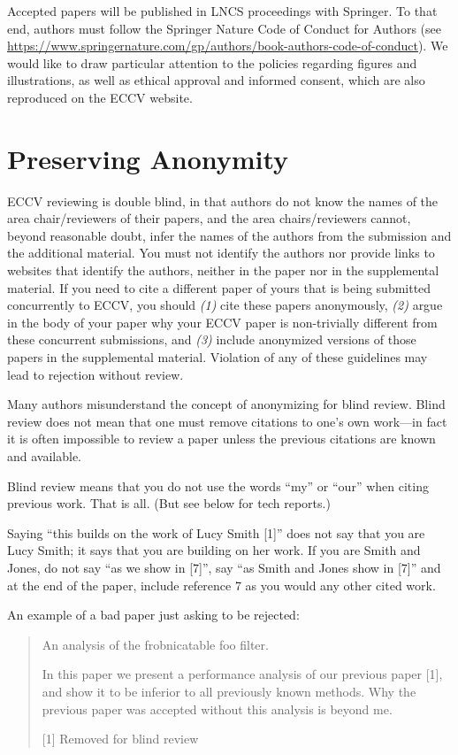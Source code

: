 \documentclass[runningheads]{llncs}
\begin{document}
Accepted papers will be published in LNCS proceedings with Springer.
To that end, authors must follow the Springer Nature Code of Conduct for Authors (see \url{https://www.springernature.com/gp/authors/book-authors-code-of-conduct}).
We would like to draw particular attention to the policies regarding figures and illustrations, as well as ethical approval and informed consent, which are also reproduced on the ECCV website.


\section{Preserving Anonymity}
\label{sec:blind}
ECCV reviewing is double blind, in that authors do not know the names of the area chair/reviewers of their papers, and the area chairs/reviewers cannot, beyond reasonable doubt, infer the names of the authors from the submission and the additional material. 
You must not identify the authors nor provide links to websites that identify the authors, neither in the paper nor in the supplemental material.
If you need to cite a different paper of yours that is being submitted concurrently to ECCV, you should \emph{(1)} cite these papers anonymously, \emph{(2)} argue in the body of your paper why your ECCV paper is non-trivially different from these concurrent submissions, and \emph{(3)} include anonymized versions of those papers in the supplemental material.
Violation of any of these guidelines may lead to rejection without review. 

Many authors misunderstand the concept of anonymizing for blind review.
Blind review does not mean that one must remove citations to one's own work---in fact it is often impossible to review a paper unless the previous citations are known and available.

Blind review means that you do not use the words ``my'' or ``our'' when citing previous work.
That is all.
(But see below for tech reports.)

Saying ``this builds on the work of Lucy Smith [1]'' does not say that you are Lucy Smith;
it says that you are building on her work.
If you are Smith and Jones, do not say ``as we show in [7]'', say ``as Smith and Jones show in [7]'' and at the end of the paper, include reference 7 as you would any other cited work.

An example of a bad paper just asking to be rejected:
\begin{quote}
  \begin{center}
      An analysis of the frobnicatable foo filter.
  \end{center}

   In this paper we present a performance analysis of our previous paper [1], and show it to be inferior to all previously known methods.
   Why the previous paper was accepted without this analysis is beyond me.

   [1] Removed for blind review
\end{quote}
\end{document}

